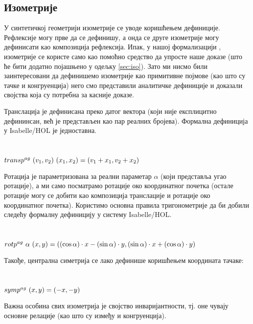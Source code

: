 \subsection{Изометрије}

У синтетичкој геометрији изометрије се уводе коришћењем
дефиниције. Рефлексије могу прве да се дефинишу, а онда се друге
изометрије могу дефинисати као композиција рефлексија. Ипак, у нашој
формализацији , изометрије се користе само као помоћно средство да
упросте наше доказе (што ће бити додатно појашњено у одељку
\ref{sec:iso}). Зато ми нисмо били заинтересовани да дефинишемо
изометрије као примитивне појмове (као што су тачке и конгруенција)
него смо представили аналитичке дефиниције и доказали својства која су
потребна за касније доказе.

Транслација је дефинисана преко датог вектора (који није експлицитно
дефининсан, већ је представљен као пар реалних бројева). Формална
дефиниција у Isabelle/HOL је једноставна.

{\tt
\begin{tabbing}
$transp^{ag}\ (v_1, v_2)\ (x_1, x_2) = (v_1 + x_1, v_2 + x_2)$
\end{tabbing}
}

Ротација је параметризована за реални параметар $\alpha$ (који
представља угао ротације), а ми само посматрамо ротације око
координатног почетка (остале ротације могу се добити као композиција
транслације и ротације око координатног почетка).  Користимо основна
правила тригонометрије да би добили следећу формалну дефиницију у
систему Isabelle/HOL.

{\tt
\begin{tabbing}
$rotp^{ag}\ \alpha\ (x, y) = ((\cos \alpha)\cdot x - (\sin
\alpha)\cdot y , (\sin \alpha)\cdot x + (\cos \alpha)\cdot y)$
\end{tabbing}
}

Такође, централна симетрија се лако дефинише коришћењем координата
тачаке:
 {\tt
\begin{tabbing}
$symp^{ag}\ (x, y) = (-x, -y)$
\end{tabbing}
}

Важна особина свих изометрија је својство инваријантности, тј.  оне
чувају основне релације (као што су између и конгруенција).


